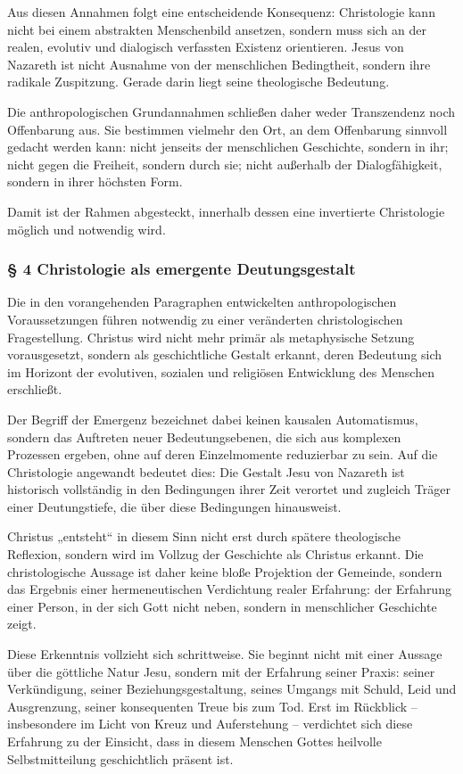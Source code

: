 \documentclass[
  ngerman,
]{article}
\begin{document}
Aus diesen Annahmen folgt eine entscheidende Konsequenz: Christologie
kann nicht bei einem abstrakten Menschenbild ansetzen, sondern muss sich
an der realen, evolutiv und dialogisch verfassten Existenz orientieren.
Jesus von Nazareth ist nicht Ausnahme von der menschlichen Bedingtheit,
sondern ihre radikale Zuspitzung. Gerade darin liegt seine theologische
Bedeutung.

Die anthropologischen Grundannahmen schließen daher weder Transzendenz
noch Offenbarung aus. Sie bestimmen vielmehr den Ort, an dem Offenbarung
sinnvoll gedacht werden kann: nicht jenseits der menschlichen
Geschichte, sondern in ihr; nicht gegen die Freiheit, sondern durch sie;
nicht außerhalb der Dialogfähigkeit, sondern in ihrer höchsten Form.

Damit ist der Rahmen abgesteckt, innerhalb dessen eine invertierte
Christologie möglich und notwendig wird.

\subsubsection{§ 4 Christologie als emergente
Deutungsgestalt}\label{christologie-als-emergente-deutungsgestalt}

Die in den vorangehenden Paragraphen entwickelten anthropologischen
Voraussetzungen führen notwendig zu einer veränderten christologischen
Fragestellung. Christus wird nicht mehr primär als metaphysische Setzung
vorausgesetzt, sondern als geschichtliche Gestalt erkannt, deren
Bedeutung sich im Horizont der evolutiven, sozialen und religiösen
Entwicklung des Menschen erschließt.

Der Begriff der Emergenz bezeichnet dabei keinen kausalen Automatismus,
sondern das Auftreten neuer Bedeutungsebenen, die sich aus komplexen
Prozessen ergeben, ohne auf deren Einzelmomente reduzierbar zu sein. Auf
die Christologie angewandt bedeutet dies: Die Gestalt Jesu von Nazareth
ist historisch vollständig in den Bedingungen ihrer Zeit verortet und
zugleich Träger einer Deutungstiefe, die über diese Bedingungen
hinausweist.

Christus „entsteht`` in diesem Sinn nicht erst durch spätere
theologische Reflexion, sondern wird im Vollzug der Geschichte als
Christus erkannt. Die christologische Aussage ist daher keine bloße
Projektion der Gemeinde, sondern das Ergebnis einer hermeneutischen
Verdichtung realer Erfahrung: der Erfahrung einer Person, in der sich
Gott nicht neben, sondern in menschlicher Geschichte zeigt.

Diese Erkenntnis vollzieht sich schrittweise. Sie beginnt nicht mit
einer Aussage über die göttliche Natur Jesu, sondern mit der Erfahrung
seiner Praxis: seiner Verkündigung, seiner Beziehungsgestaltung, seines
Umgangs mit Schuld, Leid und Ausgrenzung, seiner konsequenten Treue bis
zum Tod. Erst im Rückblick -- insbesondere im Licht von Kreuz und
Auferstehung -- verdichtet sich diese Erfahrung zu der Einsicht, dass in
diesem Menschen Gottes heilvolle Selbstmitteilung geschichtlich präsent
ist.
\end{document}
